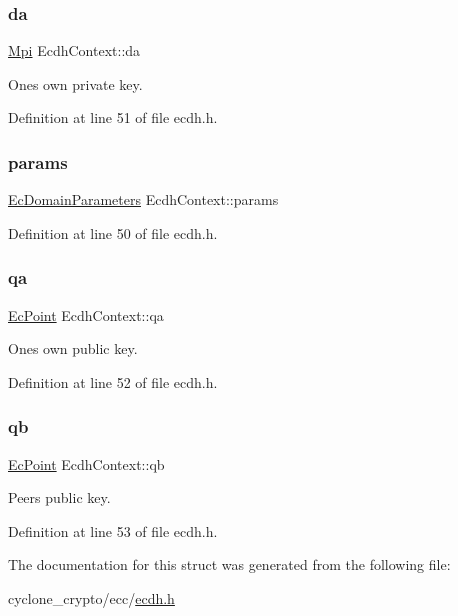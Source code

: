 \subsubsection{\texorpdfstring{da}{da}}
{\footnotesize\ttfamily \hyperlink{structMpi}{Mpi} Ecdh\+Context\+::da}



One\textquotesingle{}s own private key. 



Definition at line 51 of file ecdh.\+h.

\mbox{\label{structEcdhContext_ad7a1d278081f5d47410da42c58e248df}} 
\subsubsection{\texorpdfstring{params}{params}}
{\footnotesize\ttfamily \hyperlink{structEcDomainParameters}{Ec\+Domain\+Parameters} Ecdh\+Context\+::params}



Definition at line 50 of file ecdh.\+h.

\mbox{\label{structEcdhContext_aee88c6acd90bffb45a74fa3280b0328a}} 
\subsubsection{\texorpdfstring{qa}{qa}}
{\footnotesize\ttfamily \hyperlink{structEcPoint}{Ec\+Point} Ecdh\+Context\+::qa}



One\textquotesingle{}s own public key. 



Definition at line 52 of file ecdh.\+h.

\mbox{\label{structEcdhContext_a1de1436bb839104e2a7be87598a33a5d}} 
\subsubsection{\texorpdfstring{qb}{qb}}
{\footnotesize\ttfamily \hyperlink{structEcPoint}{Ec\+Point} Ecdh\+Context\+::qb}



Peer\textquotesingle{}s public key. 



Definition at line 53 of file ecdh.\+h.



The documentation for this struct was generated from the following file\+:\begin{DoxyCompactItemize}
\item 
cyclone\+\_\+crypto/ecc/\hyperlink{ecdh_8h}{ecdh.\+h}\end{DoxyCompactItemize}
